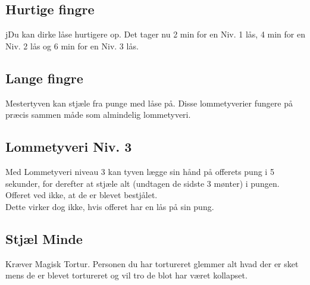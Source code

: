 \subsection{Hurtige fingre}
jDu kan dirke låse hurtigere op. Det tager nu 2 min for en Niv. 1 lås, 4 min for en Niv. 2 lås og 6 min for en Niv. 3 lås.\\

\subsection{Lange fingre}
Mestertyven kan stjæle fra punge med låse på. Disse lommetyverier fungere på
præcis sammen måde som almindelig lommetyveri.\\

\subsection{Lommetyveri Niv. 3}
Med Lommetyveri niveau 3 kan tyven lægge sin hånd på offerets pung i 5 sekunder, for derefter at stjæle alt (undtagen de sidste 3 mønter) i pungen. Offeret ved ikke, at de er blevet bestjålet. \\
Dette virker dog ikke, hvis offeret har en lås på sin pung.\\

\subsection{Stjæl Minde}
Kræver Magisk Tortur. Personen du har tortureret glemmer alt hvad der er sket mens de er blevet tortureret og vil tro de blot har været kollapset.